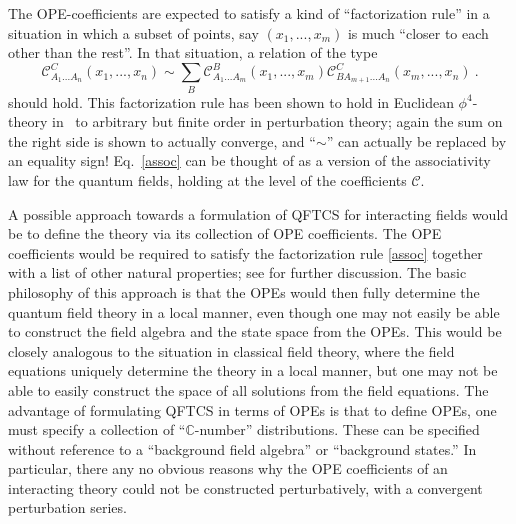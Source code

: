 \documentclass[12pt]{article}
\newcommand{\cC}{\mathcal{C}}
\newcommand{\CC}{\mathbb{C}}
\theoremstyle{plain}
\theoremstyle{definition}
\def\ben{\begin{equation}}
\def\een{\end{equation}}
\begin{document}
The OPE-coefficients are expected to satisfy a kind of ``factorization rule'' in a situation in which a subset of points, say $(x_1, ..., x_m)$ is much ``closer to each other than the rest''. In that situation, a relation of the type
\ben
\cC_{A_1 ... A_n}^C(x_1, ..., x_n) \sim \sum_B \cC_{A_1 ... A_m}^B(x_1, ..., x_m) \cC_{BA_{m+1} ... A_n}^C(x_m, ..., x_n) \ .
\label{assoc}
\een
should hold. 
This factorization rule has been shown to hold in Euclidean $\phi^4$-theory in~\cite{h5} to arbitrary but finite order in perturbation theory; again the sum on the right side is shown to actually converge, and ``$\sim$'' can actually be replaced by an equality sign! Eq.~\eqref{assoc} can be thought of as a version of the associativity law for the quantum fields, holding at the level of the coefficients $\cC$. 

A possible approach towards a formulation of QFTCS for interacting fields would be to define the theory via its collection of
OPE coefficients. The OPE coefficients would be required to satisfy the factorization rule \eqref{assoc} together with a list of other natural properties; see \cite{hw5} for further discussion. The basic philosophy of this approach is that the OPEs would then fully determine the quantum field theory in a local manner, even though one may not easily
be able to construct the field algebra and the state space from the OPEs. This would be closely analogous
to the situation in classical field theory, where the field equations uniquely determine the theory in a local manner, but one may not be able to easily construct the space of all solutions from the field equations. The advantage of formulating
QFTCS in terms of OPEs is that to define OPEs, one must specify a collection of ``$\CC$-number'' distributions. These
can be specified without reference to a ``background field algebra'' or ``background states.''  In particular, there any no
obvious reasons why the OPE coefficients of an interacting theory could not be constructed perturbatively, with a convergent perturbation series.
\end{document}
